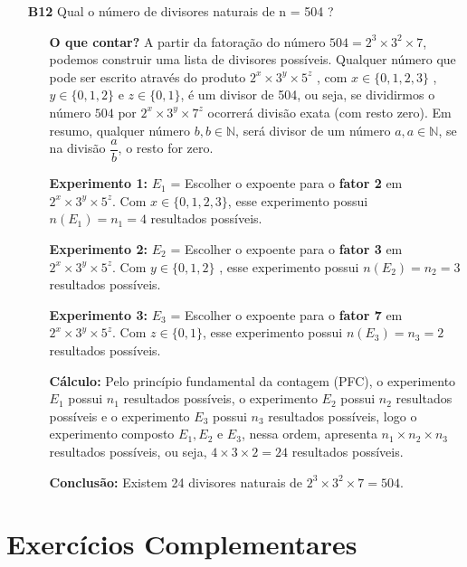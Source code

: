 \documentclass[a4paper,12pt]{article}
\begin{document}
\begin{enumerate}
\item[\textbf{B12}] Qual o número de divisores naturais de n = 504 ?
  \begin{itemize}
    \item[\ding{172}] \textbf{O que contar?} A partir da fatoração do número $ 504 = 2^3 \times 3^2 \times 7$, podemos construir uma lista de divisores possíveis. Qualquer número que pode ser escrito através do produto $2^x \times 3^y \times 5^z$ , com $x \in \{0,1,2,3\}$ , $y \in \{0,1,2\}$ e $z \in \{0,1\}$, é um divisor de 504, ou seja, se dividirmos o número $504 \textrm{ por } 2^x \times 3^y \times 7^z$ ocorrerá divisão exata (com resto zero). Em resumo, qualquer número $b, b \in \mathbb{N}$, será divisor de um número $a, a \in \mathbb{N}$, se na divisão $\dfrac{a}{b}$, o resto for zero.
    \item[\ding{173}] \textbf{Experimento 1:} $E_1$ = Escolher o expoente para o \textbf{fator 2} em $2^x \times 3^y \times 5^z$. Com $x \in \{0,1,2,3\}$, esse experimento possui $n(E_1) = n_1 = 4$ resultados possíveis.
    \item[\ding{174}] \textbf{Experimento 2:} $E_2$ = Escolher o expoente para o \textbf{fator 3} em $2^x \times 3^y \times 5^z$. Com $y \in \{0,1,2\}$ , esse experimento possui $n(E_2) = n_2 = 3$ resultados possíveis.
    \item[\ding{175}] \textbf{Experimento 3:} $E_3$ = Escolher o expoente para o \textbf{fator 7} em $2^x \times 3^y \times 5^z$. Com $z \in \{0,1\}$, esse experimento possui $n(E_3) = n_3 = 2$ resultados possíveis.
    \item[\ding{176}] \textbf{Cálculo:} Pelo princípio fundamental da contagem (PFC), o experimento $E_1$ possui $n_1$ resultados possíveis, o experimento $E_2$ possui $n_2$ resultados possíveis e o experimento $E_3$ possui $n_3$ resultados possíveis, logo o experimento composto $E_1, E_2 \textrm{ e } E_3$, nessa ordem, apresenta $n_1 \times n_2 \times n_3$ resultados possíveis, ou seja, $4 \times 3 \times 2 = 24$ resultados possíveis.
    \item[\ding{177}] \textbf{Conclusão:} Existem 24 divisores naturais de $2^3 \times 3^2 \times 7 = 504$.  
  \end{itemize}   

\end{enumerate} %

\newpage

\section{Exercícios Complementares}
\end{document}
